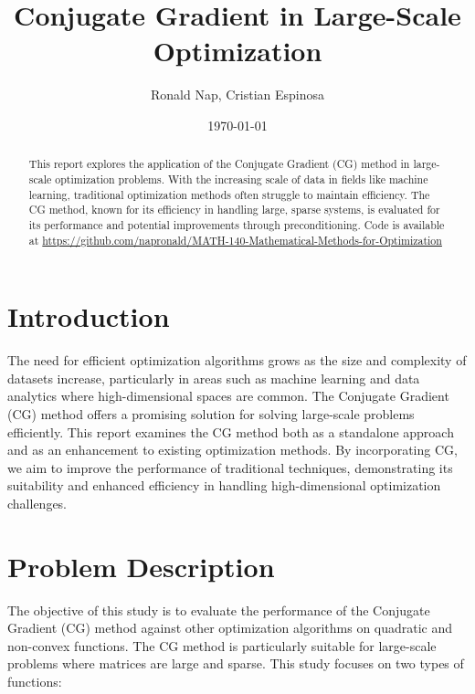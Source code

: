 \documentclass[11pt]{article}
\title{Conjugate Gradient in Large-Scale Optimization}
\author{Ronald Nap, Cristian Espinosa}
\date{\today}
\begin{document}
\maketitle

\begin{abstract}
This report explores the application of the Conjugate Gradient (CG) method in large-scale optimization problems. With the increasing scale of data in fields like machine learning, traditional optimization methods often struggle to maintain efficiency. The CG method, known for its efficiency in handling large, sparse systems, is evaluated for its performance and potential improvements through preconditioning. Code is available at \href{https://github.com/napronald/MATH-140-Mathematical-Methods-for-Optimization}{https://github.com/napronald/MATH-140-Mathematical-Methods-for-Optimization}
\end{abstract}

\section{Introduction}

The need for efficient optimization algorithms grows as the size and complexity of datasets increase, particularly in areas such as machine learning and data analytics where high-dimensional spaces are common. The Conjugate Gradient (CG) method offers a promising solution for solving large-scale problems efficiently. This report examines the CG method both as a standalone approach and as an enhancement to existing optimization methods. By incorporating CG, we aim to improve the performance of traditional techniques, demonstrating its suitability and enhanced efficiency in handling high-dimensional optimization challenges.

\section{Problem Description}

The objective of this study is to evaluate the performance of the Conjugate Gradient (CG) method against other optimization algorithms on quadratic and non-convex functions. The CG method is particularly suitable for large-scale problems where matrices are large and sparse. This study focuses on two types of functions:
\end{document}
